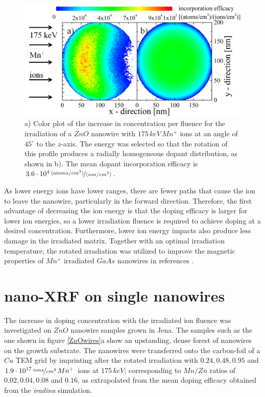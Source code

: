 \begin{figure}
	\centering
		\includegraphics[width=.8\textwidth]{images/iradinacrosssection.png}
	\caption{a) Color plot of the increase in concentration per fluence for the irradiation of a $ZnO$ nanowire with $175\,keV\,Mn^+$ ions at an angle of $45^\circ$ to the $z$-axis. The energy was selected so that the rotation of this profile produces a radially homogeneous dopant distribution, as shown in b). The mean dopant incorporation efficacy is $3.6\cdot10^4\,\nicefrac{(atoms/cm^3)}{(ion/cm^2)}$.}
	\label{iradinacrossection}
\end{figure} 

As lower energy ions have lower ranges, there are fewer paths that cause the ion to leave the nanowire, particularly in the forward direction. Therefore, the first advantage of decreasing the ion energy is that the doping efficacy is larger for lower ion energies, so a lower irradiation fluence is required to achieve doping at a desired concentration. Furthermore, lower ion energy impacts also produce less damage in the irradiated matrix. Together with an optimal irradiation temperature, the rotated irradiation was utilized to improve the magnetic properties of $Mn^+$ irradiated $GaAs$ nanowires in references \cite{borschel_new_2011,paschoal_hopping_2012,borschel_ion-solid_2012,kumar_magnetic_2013,paschoal_magnetoresistance_2014}. 




\section{nano-XRF on single nanowires}

The increase in doping concentration with the irradiated ion fluence was investigated on $ZnO$ nanowire samples grown in Jena. The samples such as the one shown in figure \ref{ZnOwires}a show an upstanding, dense forest of nanowires on the growth substrate. The nanowires were transferred onto the carbon-foil of a $Cu$ TEM grid by imprinting after the rotated irradiation with $0.24, 0.48, 0.95$ and $1.9\cdot 10^{17}\,\nicefrac{ions}{cm^2}\,Mn^+$ ions at $175\,keV$; corresponding to $Mn/Zn$ ratios of $0.02, 0.04, 0.08$ and $0.16$, as extrapolated from the mean doping efficacy obtained from the \emph{iradina} simulation.

